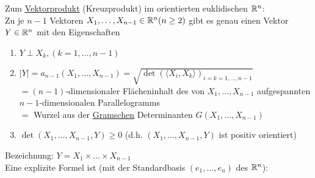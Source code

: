 Zum \uline{Vektorprodukt} (Kreuzprodukt) im orientierten euklidischen \(\mathbb{R}^n\): \\
  Zu je \(n-1\) Vektoren \(X_1, \dots, X_{n-1} \in \mathbb{R}^n (n\ge 2)\) gibt es genau einen Vektor \(Y\in \mathbb{R}^n\) mit den Eigenschaften
  \begin{enumerate}
   \item \(Y \perp X_k, (k = 1, \dots, n-1) \)
   \item \(|Y|=a_{n-1}(X_1, \dots, X_{n-1}) = \sqrt{\det\left(\langle X_i, X_k \rangle\right)_{i=k=1,\dots,n-1}} \) \\
	  \(= (n-1)\)-dimensionaler Flächeninhalt des von \(X_1, \dots, X_{n-1}\) aufgespannten \(n-1\)-dimensionalen Parallelogramms \\
	  \(=\) Wurzel aus der \uline{Gramschen} Determinanten \(G(X_1,\dots, X_{n-1})\)
   \item \(\det (X_1, \dots, X_{n-1}, Y) \ge 0\) (d.h. \((X_1, \dots, X_{n-1}, Y)\) ist positiv orientiert)
  \end{enumerate}
Bezeichnung: \(Y=X_1 \times \dots \times X_{n-1}\) \\
Eine explizite Formel ist (mit der Standardbasis \((e_1, \dots , e_n)\) des \(\mathbb{R}^n\)): 
